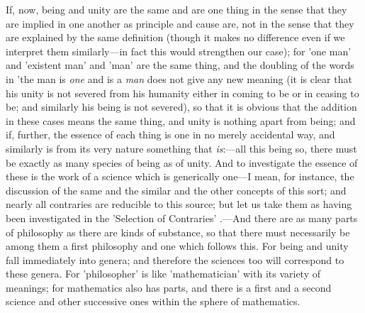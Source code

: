 If, now, being and unity are the same and are one thing in the sense that they are implied in one another as principle and cause are, not in the sense that they are explained by the same definition (though it makes no difference even if we interpret them similarly—in fact this would strengthen our case); for 'one man' and 'existent man' and 'man' are the same thing, and the doubling of the words in 'the man is \emph{one} and is a \emph{man} does not give any new meaning (it is clear that his unity is not severed from his humanity either in coming to be or in ceasing to be; and similarly his being is not severed), so that it is obvious that the addition in these cases means the same thing, and unity is nothing
apart from being; and if, further, the essence of each thing is one in no merely accidental way, and similarly is from its very nature something that \emph{is}:—all this being so, there must be exactly as many species of being as of unity. And to investigate the essence of these is the work of a science which is generically one—I mean, for instance, the discussion of the same and the similar and the other concepts of this sort; and nearly all contraries are reducible to this source; but let us take them as having been investigated in the 'Selection of Contraries'
.—And there are as many parts of philosophy as there are kinds of substance, so that there must necessarily be among them a first philosophy and one which follows this. For being and unity fall immediately into genera; and therefore the sciences too will correspond to these genera. For 'philosopher' is like 'mathematician' with its variety of meanings; for mathematics also has parts, and there is a first and a second science and other successive ones within the sphere of mathematics.

